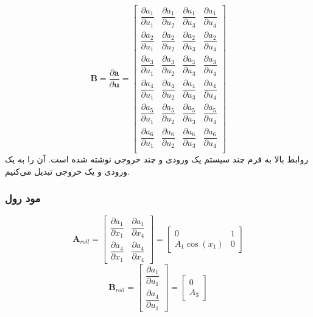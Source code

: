 \begin{equation}
	\boldsymbol B = \dfrac{\partial \boldsymbol a}{\partial \boldsymbol u} = 
	\begin{bmatrix}
		\dfrac{\partial  a_1}{\partial  u_1}&
		\dfrac{\partial  a_1}{\partial  u_2}&
		\dfrac{\partial  a_1}{\partial  u_3}&
		\dfrac{\partial  a_1}{\partial  u_4}
		\\[1em]
		\dfrac{\partial  a_2}{\partial  u_1}&
		\dfrac{\partial  a_2}{\partial  u_2}&
		\dfrac{\partial  a_2}{\partial  u_3}&
		\dfrac{\partial  a_2}{\partial  u_4}
		\\[1em]
		\dfrac{\partial  a_3}{\partial  u_1}&
		\dfrac{\partial  a_3}{\partial  u_2}&
		\dfrac{\partial  a_3}{\partial  u_3}&
		\dfrac{\partial  a_3}{\partial  u_4}
		\\[1em]
		\dfrac{\partial  a_4}{\partial  u_1}&
		\dfrac{\partial  a_4}{\partial  u_2}&
		\dfrac{\partial  a_4}{\partial  u_3}&
		\dfrac{\partial  a_4}{\partial  u_4}
		\\[1em]
		\dfrac{\partial  a_5}{\partial  u_1}&
		\dfrac{\partial  a_5}{\partial  u_2}&
		\dfrac{\partial  a_5}{\partial  u_3}&
		\dfrac{\partial  a_5}{\partial  u_4}
		\\[1em]
		\dfrac{\partial  a_6}{\partial  u_1}&
		\dfrac{\partial  a_6}{\partial  u_2}&
		\dfrac{\partial  a_6}{\partial  u_3}&
		\dfrac{\partial  a_6}{\partial  u_4}
		\\[1em]
	\end{bmatrix}
\end{equation}
روابط بالا به فرم چند سیستم یک ورودی و چند خروجی نوشته ‌شده ‌است. آن را به یک ورودی و یک خروجی تبدیل می‌کنیم.
\subsubsection{مود رول}
\begin{equation}
	\boldsymbol A_{roll} = \begin{bmatrix}
		\dfrac{\partial  a_1}{\partial  x_1}& \dfrac{\partial  a_1}{\partial  x_4}
		\\[1em]
		\dfrac{\partial  a_4}{\partial  x_1}& \dfrac{\partial  a_4}{\partial  x_4}
	\end{bmatrix} = 
	\begin{bmatrix}
		0 & 1\\
		A_1\cos(x_1) & 0
	\end{bmatrix}
\end{equation}
\begin{equation}
	\boldsymbol B_{roll} = \begin{bmatrix}
		\dfrac{\partial  a_1}{\partial  u_1}
		\\[1em]
		\dfrac{\partial  a_4}{\partial  u_1}
	\end{bmatrix} = 
	\begin{bmatrix}
		0\\
		A_3
	\end{bmatrix}
\end{equation}

